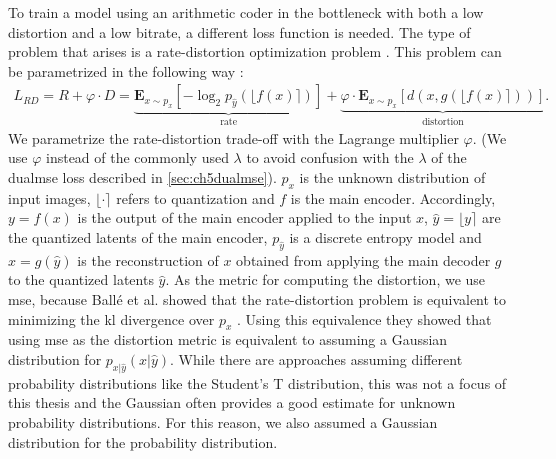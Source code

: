 To train a model using an arithmetic coder in the bottleneck with both a low distortion and a low bitrate, a different loss function is needed. The type of problem that arises is a rate-distortion optimization problem \citep{balle_variational_2018}. This problem can be parametrized in the following way \citep{minnen_joint_2018}:
\begin{align}
L_{RD} = R + \varphi \cdot D = \underbrace{\mathbf{E}_{x\sim p_x} [ -\log_2 p_{\hat{y}}(\lfloor f(x)\rceil)]}_\text{rate}+ \underbrace{\varphi \cdot\mathbf{E}_{x\sim p_x} [d(x,g(\lfloor f(x)\rceil))]}_\text{distortion}.
\end{align}
We parametrize the rate-distortion trade-off with the Lagrange multiplier $\varphi$. (We use $\varphi$ instead of the commonly used $\lambda$ to avoid confusion with the $\lambda$ of the \ac{dualmse} loss described in \autoref{sec:ch5dualmse}). $p_x$ is the unknown distribution of input images, $\lfloor\cdot\rceil$ refers to quantization and $f$ is the main encoder. Accordingly, $y=f(x)$ is the output of the main encoder applied to the input $x$, $\hat{y} = \lfloor y\rceil$ are the quantized latents of the main encoder, $p_{\hat{y}}$ is a discrete entropy model and $\hat{x}=g(\hat{y})$ is the reconstruction of $x$ obtained from applying the main decoder $g$ to the quantized latents $\hat{y}$. As the metric for computing the distortion, we use \ac{mse}, because Ballé et al. showed that the rate-distortion problem is equivalent to minimizing the \ac{kl} divergence over $p_x$ \citep{balle_variational_2018}. Using this equivalence they showed that using \ac{mse} as the distortion metric is equivalent to assuming a Gaussian distribution for $p_{x|\hat{y}}(x|\hat{y})$. While there are approaches assuming different probability distributions like the Student's T distribution, this was not a focus of this thesis and the Gaussian often provides a good estimate for unknown probability distributions. For this reason, we also assumed a Gaussian distribution for the probability distribution.

